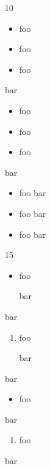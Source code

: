 10

\begin{itemize}
\item foo

\item foo

\item foo

\end{itemize}

bar

\begin{itemize}
\item foo

\item foo

\item foo

\end{itemize}

bar

\begin{itemize}
\item foo
bar

\item foo
bar

\item foo
bar

\end{itemize}

15

\begin{itemize}
\item foo

bar

\end{itemize}

bar

\begin{enumerate}
\item foo

bar

\end{enumerate}

bar

\begin{itemize}
\item foo

\end{itemize}

bar

\begin{enumerate}
\item foo

\end{enumerate}

bar



